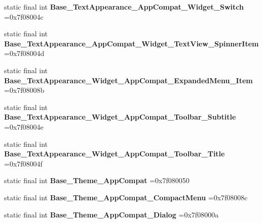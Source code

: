 \begin{DoxyCompactItemize}
\item 
\hypertarget{classcheck_1_1test_1_1_r_1_1style_af825a9b419e94ec4a8fc1c1e444e344c}{}static final int {\bfseries Base\+\_\+\+Text\+Appearance\+\_\+\+App\+Compat\+\_\+\+Widget\+\_\+\+Switch} =0x7f08004c\label{classcheck_1_1test_1_1_r_1_1style_af825a9b419e94ec4a8fc1c1e444e344c}

\item 
\hypertarget{classcheck_1_1test_1_1_r_1_1style_aff7788fb3ebb26b04f5503458e66e9b8}{}static final int {\bfseries Base\+\_\+\+Text\+Appearance\+\_\+\+App\+Compat\+\_\+\+Widget\+\_\+\+Text\+View\+\_\+\+Spinner\+Item} =0x7f08004d\label{classcheck_1_1test_1_1_r_1_1style_aff7788fb3ebb26b04f5503458e66e9b8}

\item 
\hypertarget{classcheck_1_1test_1_1_r_1_1style_afcca64bbd946ab38e9dd1f3c155b0936}{}static final int {\bfseries Base\+\_\+\+Text\+Appearance\+\_\+\+Widget\+\_\+\+App\+Compat\+\_\+\+Expanded\+Menu\+\_\+\+Item} =0x7f08008b\label{classcheck_1_1test_1_1_r_1_1style_afcca64bbd946ab38e9dd1f3c155b0936}

\item 
\hypertarget{classcheck_1_1test_1_1_r_1_1style_a8e92eb2c88e987135a2ac2a595bb8eae}{}static final int {\bfseries Base\+\_\+\+Text\+Appearance\+\_\+\+Widget\+\_\+\+App\+Compat\+\_\+\+Toolbar\+\_\+\+Subtitle} =0x7f08004e\label{classcheck_1_1test_1_1_r_1_1style_a8e92eb2c88e987135a2ac2a595bb8eae}

\item 
\hypertarget{classcheck_1_1test_1_1_r_1_1style_ab09afe3962ba87a812f8b100645e98e0}{}static final int {\bfseries Base\+\_\+\+Text\+Appearance\+\_\+\+Widget\+\_\+\+App\+Compat\+\_\+\+Toolbar\+\_\+\+Title} =0x7f08004f\label{classcheck_1_1test_1_1_r_1_1style_ab09afe3962ba87a812f8b100645e98e0}

\item 
\hypertarget{classcheck_1_1test_1_1_r_1_1style_acf4e5cf32aba4bca0f1a9f609d166006}{}static final int {\bfseries Base\+\_\+\+Theme\+\_\+\+App\+Compat} =0x7f080050\label{classcheck_1_1test_1_1_r_1_1style_acf4e5cf32aba4bca0f1a9f609d166006}

\item 
\hypertarget{classcheck_1_1test_1_1_r_1_1style_a4e46a69a05be9af68dba55b7b0e65b47}{}static final int {\bfseries Base\+\_\+\+Theme\+\_\+\+App\+Compat\+\_\+\+Compact\+Menu} =0x7f08008c\label{classcheck_1_1test_1_1_r_1_1style_a4e46a69a05be9af68dba55b7b0e65b47}

\item 
\hypertarget{classcheck_1_1test_1_1_r_1_1style_ac1e61ded3bd391d39c6141c1fbd9243b}{}static final int {\bfseries Base\+\_\+\+Theme\+\_\+\+App\+Compat\+\_\+\+Dialog} =0x7f08000a\label{classcheck_1_1test_1_1_r_1_1style_ac1e61ded3bd391d39c6141c1fbd9243b}


\end{DoxyCompactItemize}
